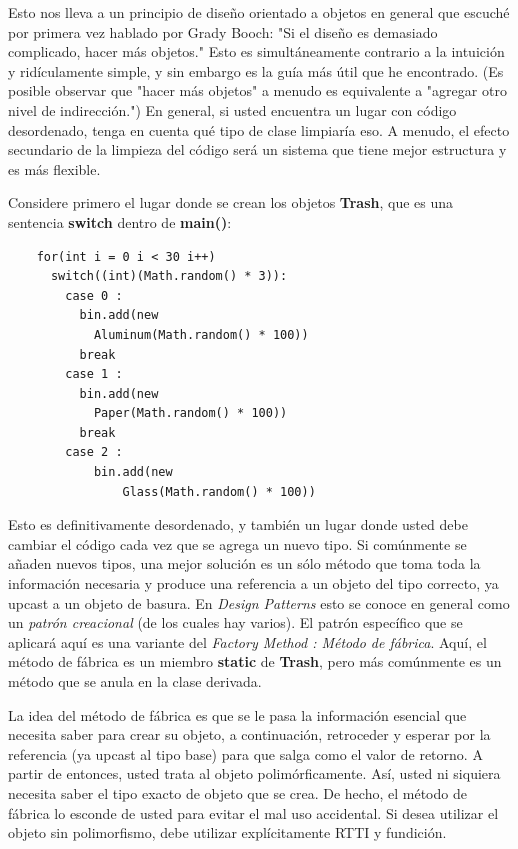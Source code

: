 \documentclass{article}
\begin{document}
Esto nos lleva a un principio de diseño orientado a objetos en general que escuché por primera vez hablado por Grady Booch: "Si el diseño es demasiado complicado, hacer más objetos." Esto es simultáneamente contrario a la intuición y ridículamente simple, y sin embargo es la guía más útil que he encontrado. (Es posible observar que "hacer más objetos" a menudo es equivalente a "agregar otro nivel de indirección.") En general, si usted encuentra un lugar con código desordenado, tenga en cuenta qué tipo de clase limpiaría eso. A menudo, el efecto secundario de la limpieza del código será un sistema que tiene mejor estructura y es más flexible.    \newline

Considere primero el lugar donde se crean los objetos \textbf{Trash}, que es una sentencia \textbf{switch} dentro de \textbf{main()}:    \newline

\begin{lstlisting} 
    for(int i = 0 i < 30 i++) 
      switch((int)(Math.random() * 3)): 
        case 0 : 
          bin.add(new 
            Aluminum(Math.random() * 100)) 
          break 
        case 1 : 
          bin.add(new 
            Paper(Math.random() * 100)) 
          break 
        case 2 : 
            bin.add(new 
                Glass(Math.random() * 100)) 
\end{lstlisting}

Esto es definitivamente desordenado, y también un lugar donde usted debe cambiar el código cada vez que se agrega un nuevo tipo. Si comúnmente se añaden nuevos tipos, una mejor solución es un sólo método que toma toda la información necesaria y produce una referencia a un objeto del tipo correcto, ya upcast a un objeto de basura. En \textit{Design Patterns} esto se conoce en general como un \textit{patrón creacional} (de los cuales hay varios). El patrón específico que se aplicará aquí es una variante del \textit{Factory Method : Método de fábrica}. Aquí, el método de fábrica es un miembro \textbf{static} de \textbf{Trash}, pero más comúnmente es un método que se anula en la clase derivada.  \newline

La idea del método de fábrica es que se le pasa la información esencial que necesita saber para crear su objeto, a continuación, retroceder y esperar por la referencia (ya upcast al tipo base) para que salga como el valor de retorno.  A partir de entonces, usted trata al objeto polimórficamente. Así, usted ni siquiera necesita saber el tipo exacto de objeto que se crea. De hecho, el método de fábrica lo esconde de usted para evitar el mal uso accidental. Si desea utilizar el objeto sin polimorfismo, debe utilizar explícitamente RTTI y fundición.    \newline
\end{document}

